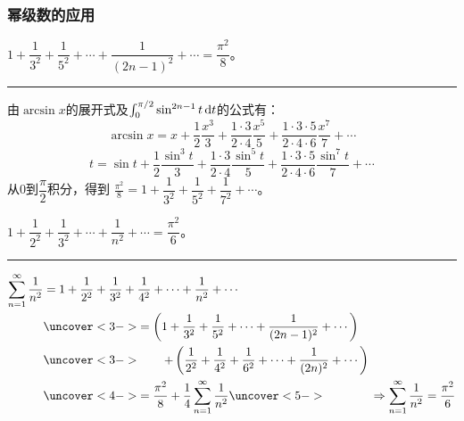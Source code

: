 \documentclass[14pt,notheorems,leqno,xcolor={rgb}]{beamer} %
\begin{document}
\begin{iframe}
\frametitle{幂级数的应用}
\begin{theorem*}%
$1+\dfrac{1}{3^2}+\dfrac{1}{5^2}+\cdots+\dfrac{1}{(2n-1)^2}+\cdots=\dfrac{\pi^2}8$。
\end{theorem*}
\pause
\vspace{0.5em}\hrule
由$\arcsin x$的展开式及$\int_0^{\pi/2}\sin^{2n-1}t\mathop{}\!\mathrm{d}{t}$的公式有：\pause
\[\arcsin x=x+\frac12\frac{x^3}3+\frac{1\cdot3}{2\cdot4}\frac{x^5}5
             +\frac{1\cdot3\cdot5}{2\cdot4\cdot6}\frac{x^7}7+\cdots\] \pause
\[t=\sin t+\frac12\frac{\sin^3t}3+\frac{1\cdot3}{2\cdot4}\frac{\sin^5t}5
             +\frac{1\cdot3\cdot5}{2\cdot4\cdot6}\frac{\sin^7t}7+\cdots\] \pause
从$0$到$\dfrac{\pi}2$积分，得到
$\displaystyle\frac{\pi^2}8=1+\dfrac{1}{3^2}+\dfrac{1}{5^2}+\dfrac{1}{7^2}+\cdots$。
\end{iframe}

\begin{iframe}
\begin{theorem*}[欧拉]
$1+\dfrac{1}{2^2}+\dfrac{1}{3^2}+\cdots+\dfrac{1}{n^2}+\cdots=\dfrac{\pi^2}6$。
\end{theorem*}
\pause
\vspace{0.5em}\hrule
\begin{align*}
\sum_{n=1}^{\infty}\frac1{n^2}&=1+\frac{1}{2^2}+\frac{1}{3^2}+\frac{1}{4^2}+\cdots+\dfrac{1}{n^2}+\cdots\\
&\uncover<3->{=\left(1+\frac{1}{3^2}+\frac{1}{5^2}+\cdots+\frac{1}{(2n-1)^2}+\cdots\right)}\\
&\uncover<3->{\qquad+\left(\frac{1}{2^2}+\frac{1}{4^2}+\frac{1}{6^2}+\cdots+\frac{1}{(2n)^2}+\cdots\right)}\\
&\uncover<4->{=\frac{\pi^2}8 + \frac14\sum_{n=1}^{\infty}\frac1{n^2}}
\uncover<5->{\qquad\qquad\Rightarrow\displaystyle\sum_{n=1}^{\infty}\frac1{n^2}=\frac{\pi^2}6}
\end{align*}
\end{iframe}

\ifligong %

\makeatletter
{}\relax %
\setcounter{section}{6}
\makeatother
\end{document}
